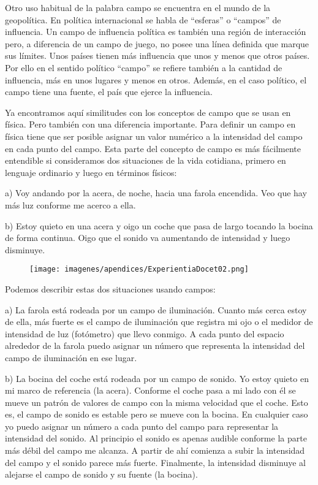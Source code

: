 Otro uso habitual de la palabra campo se encuentra en el mundo de la geopolítica. En política internacional se habla de “esferas” o “campos” de influencia. Un campo de influencia política es también una región de interacción pero, a diferencia de un campo de juego, no posee una línea definida que marque sus límites. Unos países tienen más influencia que unos y menos que otros países. Por ello en el sentido político “campo” se refiere también a la cantidad de influencia, más en unos lugares y menos en otros. Además, en el caso político, el campo tiene una fuente, el país que ejerce la influencia.

Ya encontramos aquí similitudes con los conceptos de campo que se usan en física. Pero también con una diferencia importante. Para definir un campo en física tiene que ser posible asignar un valor numérico a la intensidad del campo en cada punto del campo. Esta parte del concepto de campo es más fácilmente entendible si consideramos dos situaciones de la vida cotidiana, primero en lenguaje ordinario y luego en términos físicos:

a) Voy andando por la acera, de noche, hacia una farola encendida. Veo que hay más luz conforme me acerco a ella.

b) Estoy quieto en una acera y oigo un coche que pasa de largo tocando la bocina de forma continua. Oigo que el sonido va aumentando de intensidad y luego disminuye.

	\begin{figure}[H]
	\centering
	\texttt{[image: imagenes/apendices/ExperientiaDocet02.png]}
	\end{figure}

Podemos describir estas dos situaciones usando campos:

a) La farola está rodeada por un campo de iluminación. Cuanto más cerca estoy de ella, más fuerte es el campo de iluminación que registra mi ojo o el medidor de intensidad de luz (fotómetro) que llevo conmigo. A cada punto del espacio alrededor de la farola puedo asignar un número que representa la intensidad del campo de iluminación en ese lugar.

b) La bocina del coche está rodeada por un campo de sonido. Yo estoy quieto en mi marco de referencia (la acera). Conforme el coche pasa a mi lado con él se mueve un patrón de valores de campo con la misma velocidad que el coche. Esto es, el campo de sonido es estable pero se mueve con la bocina. En cualquier caso yo puedo asignar un número a cada punto del campo para representar la intensidad del sonido. Al principio el sonido es apenas audible conforme la parte más débil del campo me alcanza. A partir de ahí comienza a subir la intensidad del campo y el sonido parece más fuerte. Finalmente, la intensidad disminuye al alejarse el campo de sonido y su fuente (la bocina).


